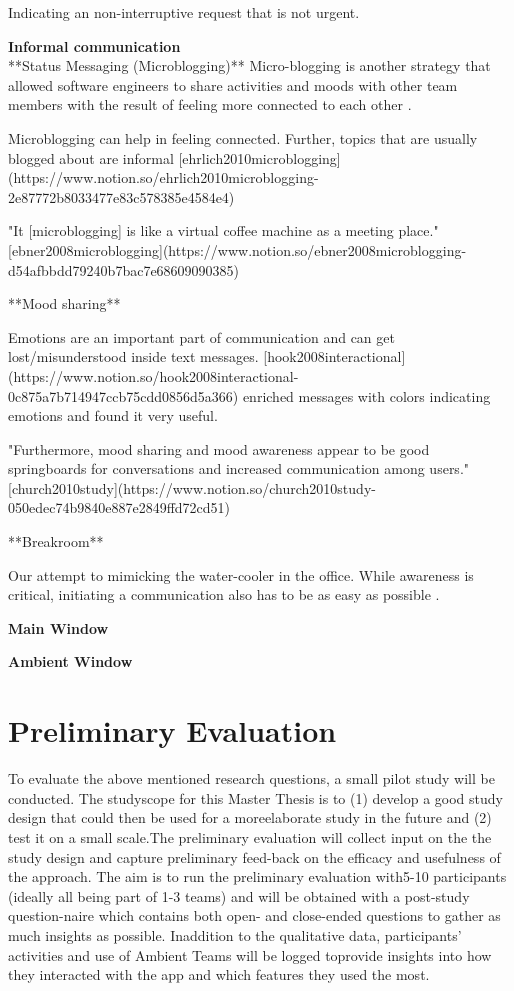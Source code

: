 Indicating an non-interruptive request that is not urgent.

\medskip\noindent\textbf{Informal communication} \\
**Status Messaging (Microblogging)**
Micro-blogging is another strategy that allowed software engineers to share activities and moods with other team members with the result of feeling more connected to each other \autocite{dullemond2013fixing}.

Microblogging can help in feeling connected. Further, topics that are usually blogged about are informal [ehrlich2010microblogging](https://www.notion.so/ehrlich2010microblogging-2e87772b8033477e83c578385e4584e4)

"It [microblogging] is like a virtual coffee machine as a meeting place." [ebner2008microblogging](https://www.notion.so/ebner2008microblogging-d54afbbdd79240b7bac7e68609090385)

**Mood sharing**

Emotions are an important part of communication and can get lost/misunderstood inside text messages. [hook2008interactional](https://www.notion.so/hook2008interactional-0c875a7b714947ccb75cdd0856d5a366) enriched messages with colors indicating emotions and found it very useful.

"Furthermore, mood sharing and mood awareness appear to be good springboards for conversations and increased communication among users." [church2010study](https://www.notion.so/church2010study-050edec74b9840e887e2849ffd72cd51)

**Breakroom**

Our attempt to mimicking the water-cooler in the office. While awareness is critical, initiating a communication also has to be as easy as possible \autocite{chang2007out}.



\medskip\noindent\textbf{Main Window}


\medskip\noindent\textbf{Ambient Window}


\section{Preliminary Evaluation}
To evaluate the above mentioned research questions, a small pilot study will be conducted. The studyscope for this Master Thesis is to (1) develop a good study design that could then be used for a moreelaborate study in the future and (2) test it on a small scale.The preliminary evaluation will collect input on the the study design and capture preliminary feed-back on the efficacy and usefulness of the approach. The aim is to run the preliminary evaluation with5-10 participants (ideally all being part of 1-3 teams) and will be obtained with a post-study question-naire which contains both open- and close-ended questions to gather as much insights as possible. Inaddition to the qualitative data, participants’ activities and use of Ambient Teams will be logged toprovide insights into how they interacted with the app and which features they used the most.